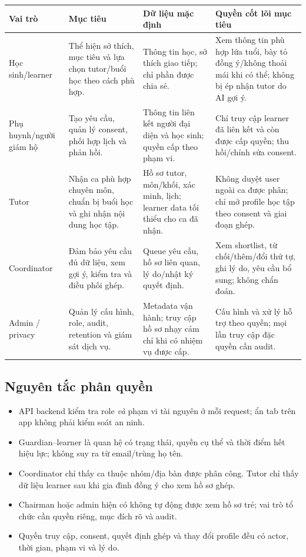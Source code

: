 \documentclass[11pt,a4paper]{article}
\begin{document}
\begin{tabularx}{\textwidth}{p{2.5cm}p{4.4cm}p{3.4cm}Y}
\toprule
\textbf{Vai trò} & \textbf{Mục tiêu} & \textbf{Dữ liệu mặc định} & \textbf{Quyền cốt lõi mục tiêu} \\
\midrule
Học sinh/learner & Thể hiện sở thích, mục tiêu và lựa chọn tutor/buổi học theo cách phù hợp. & Thông tin học, sở thích giao tiếp; chỉ phần được chia sẻ. & Xem thông tin phù hợp lứa tuổi, bày tỏ đồng ý/không thoải mái khi có thể; không bị ép nhận tutor do AI gợi ý. \\
Phụ huynh/người giám hộ & Tạo yêu cầu, quản lý consent, phối hợp lịch và phản hồi. & Thông tin liên kết người đại diện và học sinh; quyền cấp theo phạm vi. & Chỉ truy cập learner đã liên kết và còn được cấp quyền; thu hồi/chỉnh sửa consent. \\
Tutor & Nhận ca phù hợp chuyên môn, chuẩn bị buổi học và ghi nhận nội dung học tập. & Hồ sơ tutor, môn/khối, xác minh, lịch; learner data tối thiểu cho ca đã nhận. & Không duyệt user ngoài ca được phân; chỉ mở profile học tập theo consent và giai đoạn ghép. \\
Coordinator & Đảm bảo yêu cầu đủ dữ liệu, xem gợi ý, kiểm tra và điều phối ghép. & Queue yêu cầu, hồ sơ liên quan, lý do/nhật ký quyết định. & Xem shortlist, từ chối/thêm/đổi thứ tự, ghi lý do, yêu cầu bổ sung; không chẩn đoán. \\
Admin / privacy & Quản lý cấu hình, role, audit, retention và giám sát dịch vụ. & Metadata vận hành; truy cập hồ sơ nhạy cảm chỉ khi có nhiệm vụ được cấp. & Cấu hình và xử lý hỗ trợ theo quyền; mọi lần truy cập đặc quyền cần audit. \\
\bottomrule
\end{tabularx}

\subsection{Nguyên tắc phân quyền}
\begin{itemize}
  \item API backend kiểm tra role \emph{và} phạm vi tài nguyên ở mỗi request; ẩn tab trên app không phải kiểm soát an ninh.
  \item Guardian--learner là quan hệ có trạng thái, quyền cụ thể và thời điểm hết hiệu lực; không suy ra từ email/trùng họ tên.
  \item Coordinator chỉ thấy ca thuộc nhóm/địa bàn được phân công. Tutor chỉ thấy dữ liệu learner sau khi gia đình đồng ý cho xem hồ sơ ghép.
  \item Chairman hoặc admin hiện có không tự động được xem hồ sơ trẻ; vai trò tổ chức cần quyền riêng, mục đích rõ và audit.
  \item Quyền truy cập, consent, quyết định ghép và thay đổi profile đều có actor, thời gian, phạm vi và lý do.
\end{itemize}
\end{document}
